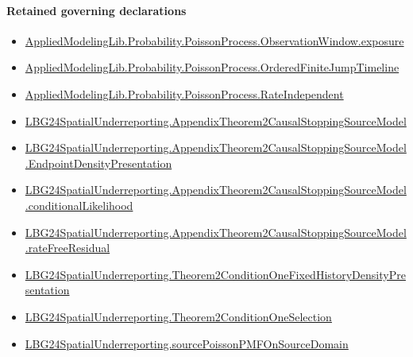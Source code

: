 \documentclass[10pt]{article}
\begin{document}
\paragraph{Retained governing declarations}
\begin{itemize}\raggedright
\item \hyperlink{governing-declaration-8fb09c88b06e0c96}{Applied\allowbreak{}Modeling\allowbreak{}Lib.\allowbreak{}Probability.\allowbreak{}Poisson\allowbreak{}Process.\allowbreak{}Observation\allowbreak{}Window.\allowbreak{}exposure}
\item \hyperlink{governing-declaration-f690c3c90ba9b3a6}{Applied\allowbreak{}Modeling\allowbreak{}Lib.\allowbreak{}Probability.\allowbreak{}Poisson\allowbreak{}Process.\allowbreak{}Ordered\allowbreak{}Finite\allowbreak{}Jump\allowbreak{}Timeline}
\item \hyperlink{governing-declaration-087044531336cf25}{Applied\allowbreak{}Modeling\allowbreak{}Lib.\allowbreak{}Probability.\allowbreak{}Poisson\allowbreak{}Process.\allowbreak{}Rate\allowbreak{}Independent}
\item \hyperlink{paper-prerequisite-2f0b30d7fa1d57d0}{LBG24\allowbreak{}Spatial\allowbreak{}Underreporting.\allowbreak{}Appendix\allowbreak{}Theorem2\allowbreak{}Causal\allowbreak{}Stopping\allowbreak{}Source\allowbreak{}Model}
\item \hyperlink{paper-prerequisite-389857bc4c8477de}{LBG24\allowbreak{}Spatial\allowbreak{}Underreporting.\allowbreak{}Appendix\allowbreak{}Theorem2\allowbreak{}Causal\allowbreak{}Stopping\allowbreak{}Source\allowbreak{}Model.\allowbreak{}Endpoint\allowbreak{}Density\allowbreak{}Presentation}
\item \hyperlink{governing-declaration-14dc9c88dba1e06b}{LBG24\allowbreak{}Spatial\allowbreak{}Underreporting.\allowbreak{}Appendix\allowbreak{}Theorem2\allowbreak{}Causal\allowbreak{}Stopping\allowbreak{}Source\allowbreak{}Model.\allowbreak{}conditional\allowbreak{}Likelihood}
\item \hyperlink{governing-declaration-7cf05f25acbc109f}{LBG24\allowbreak{}Spatial\allowbreak{}Underreporting.\allowbreak{}Appendix\allowbreak{}Theorem2\allowbreak{}Causal\allowbreak{}Stopping\allowbreak{}Source\allowbreak{}Model.\allowbreak{}rate\allowbreak{}Free\allowbreak{}Residual}
\item \hyperlink{paper-prerequisite-fc4b987b63d7ffe8}{LBG24\allowbreak{}Spatial\allowbreak{}Underreporting.\allowbreak{}Theorem2\allowbreak{}Condition\allowbreak{}One\allowbreak{}Fixed\allowbreak{}History\allowbreak{}Density\allowbreak{}Presentation}
\item \hyperlink{governing-declaration-b86695ea0bdc7438}{LBG24\allowbreak{}Spatial\allowbreak{}Underreporting.\allowbreak{}Theorem2\allowbreak{}Condition\allowbreak{}One\allowbreak{}Selection}
\item \hyperlink{governing-declaration-9a24d22062827cef}{LBG24\allowbreak{}Spatial\allowbreak{}Underreporting.\allowbreak{}source\allowbreak{}Poisson\allowbreak{}PMF\allowbreak{}On\allowbreak{}Source\allowbreak{}Domain}
\end{itemize}
\end{document}

